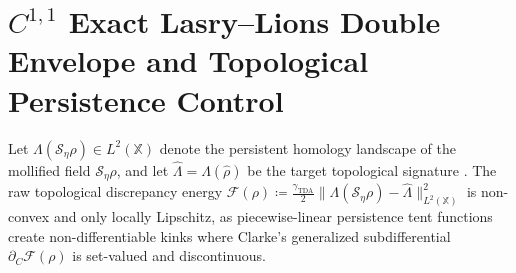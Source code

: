 \documentclass[11pt,a4paper,reqno]{article}
\theoremstyle{definition}
\theoremstyle{remark}
\begin{document}
\section[C1,1 Exact Lasry-Lions Double Envelope and Topological Persistence Control]{$C^{1,1}$ Exact Lasry--Lions Double Envelope and Topological Persistence Control}

Let $\Lambda(\mathcal{S}_\eta \rho) \in L^2(\mathbb{X})$ denote the persistent homology landscape of the mollified field $\mathcal{S}_\eta\rho$, and let $\hat{\Lambda} = \Lambda(\hat{\rho})$ be the target topological signature \cite{bubenik2015statistical, cohen2007stability}. The raw topological discrepancy energy $\mathcal{F}(\rho) \coloneqq \frac{\gamma_{\mathrm{TDA}}}{2} \|\Lambda(\mathcal{S}_\eta \rho) - \hat{\Lambda}\|_{L^2(\mathbb{X})}^2$ is non-convex and only locally Lipschitz, as piecewise-linear persistence tent functions create non-differentiable kinks where Clarke's generalized subdifferential $\partial_C\mathcal{F}(\rho)$ \cite{clarke1990optimization} is set-valued and discontinuous.
\end{document}
